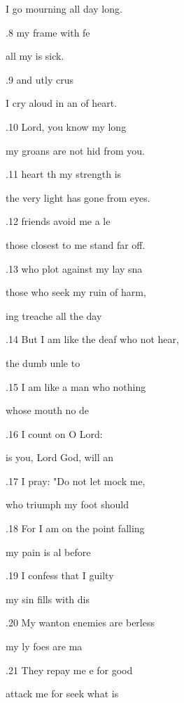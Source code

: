I go mourning all  day long. 

.8  my frame  with fe 

all my  is sick. 

.9  and utly crus 

I cry aloud in an of heart. 

.10  Lord, you know  my long 

my groans are not hid from you. 

.11  heart th my strength is  

the very light has gone from  eyes. 

.12  friends avoid me  a le 

those closest to me stand far off. 

.13  who plot against my  lay sna 

those who seek my ruin  of harm, 

ing treache all the day  

.14 But I am like the deaf who not hear, 

 the dumb unle to  

.15 I am like a man who  nothing 

 whose mouth  no de 

.16 I count on  O Lord: 

 is you, Lord God,  will an 

.17 I pray: "Do not let  mock me, 

 who triumph  my foot should  

.18 For I am on the point  falling 

 my pain is al before  

.19 I confess that I  guilty 

 my sin fills  with dis 

.20 My wanton enemies are berless 

 my ly foes are ma 

.21 They repay me e for good 

 attack me for seek what is  

